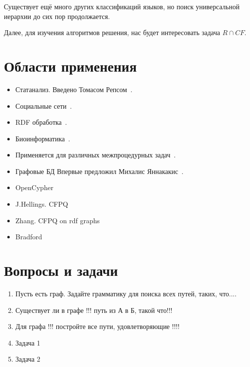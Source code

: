 Существует ещё много других классификаций языков, но поиск универсальной иерархии до сих пор продолжается.

Далее, для изучения алгоритмов решения, нас будет интересовать задача $R \cap CF$.

\section{Области применения}
\begin{itemize}
    \item Статанализ. 
    Введено Томасом Репсом~\cite{Reps}.
    \item Социальные сети~\cite{Hellings2015PathRF}.
    \item RDF обработка~\cite{10.1007/978-3-319-46523-4_38}.
    \item Биоинформатика~\cite{cfpqBio}.
    \item Применяется для различных межпроцедурных задач~\cite{LabelFlowCFLReachability,specificationCFLReachability,Zheng}.
    \item Графовые БД
    Впервые предложил Михалис Яннакакис~\cite{Yannakakis}.
    
\end{itemize}

\begin{itemize}
    \item OpenCypher~\cite{Kuijpers:2019:ESC:3335783.3335791}
    \item J.Hellings. CFPQ~\cite{hellingsRelational,hellings2015querying,Hellings2015PathRF}
    \item Zhang. CFPQ on rdf graphs~\cite{10.1007/978-3-319-46523-4_38}
    \item Bradford~\cite{bradford2007quickest,ward2008distributed,bradford2016fast,Bradford:2008:LCG:1373936.1373946}
\end{itemize}


\section{Вопросы и задачи}
\begin{enumerate}
    \item Пусть есть граф. Задайте грамматику для поиска всех путей, таких, что....
    \item Существует ли в графе !!! путь из А в Б, такой что!!!
    \item Для графа !!! постройте все пути, удовлетворяющие !!!!
    
    \item Задача 1
    \item Задача 2
\end{enumerate}
